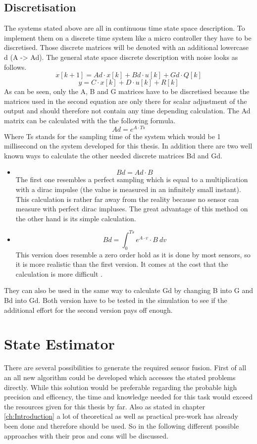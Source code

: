   \subsection{Discretisation}
  The systems stated above are all in continuous time state space description.
  To implement them on a discrete time system like a micro controller they have to be discretised.
  Those discrete matrices will be denoted with an additional lowercase d (A -> Ad).
  The general state space discrete description with noise looks as follows.
  $$ x[k+1] = Ad\cdot x[k] + Bd\cdot u[k] + Gd\cdot Q[k] $$
  $$ y = C \cdot x[k] + D\cdot u[k] + R[k] $$
  As can be seen, only the A, B and G matrices have to be discretised because
  the matrices used in the second equation are only there for scalar adjustment of the output
  and should therefore not contain any time depending calculation.
  The Ad matrix can be calculated with the the following formula.
  $$ Ad = e^{A\cdot Ts}$$
  Where Ts stands for the sampling time of the system which would be 1 millisecond on the system developed for this thesis.
  In addition there are two well known ways to calculate the other needed discrete matrices Bd and Gd.
  \begin{itemize}
   \item $$ Bd = Ad \cdot B $$
	 The first one resembles a perfect sampling which is equal to a multiplication with a dirac impulse (the value is measured in an infinitely small instant).
	 This calculation is rather far away from the reality because no sensor can measure with perfect dirac impluses.
	 The great advantage of this method on the other hand is its simple calculation.
   \item $$ Bd = \int_0^{Ts} e^{A\cdot v}\cdot B \ dv $$
	 This version does resemble a zero order hold as it is done by most sensors, so it is more realistic than the first version.
	 It comes at the cost that the calculation is more difficult \cite{DavidWSchultz2004}.
  \end{itemize}
  They can also be used in the same way to calculate Gd by changing B into G and Bd into Gd.
  Both version have to be tested in the simulation to see if the additional effort for the second version pays off enough.

  \section{State Estimator}
  There are several possibilities to generate the required sensor fusion. First of all an all new algorithm could be developed which accesses the
  stated problems directly. While this solution would be preferable regarding the probable high precision and efficency, the
  time and knowledge needed for this task would exceed the resources given for this thesis by far.
  Also as stated in chapter \ref{ch:Introduction} a lot of theoretical as well as practical pre-work has already been
  done and therefore should be used.
  So in the following different possible approaches with their pros and cons will be discussed.

